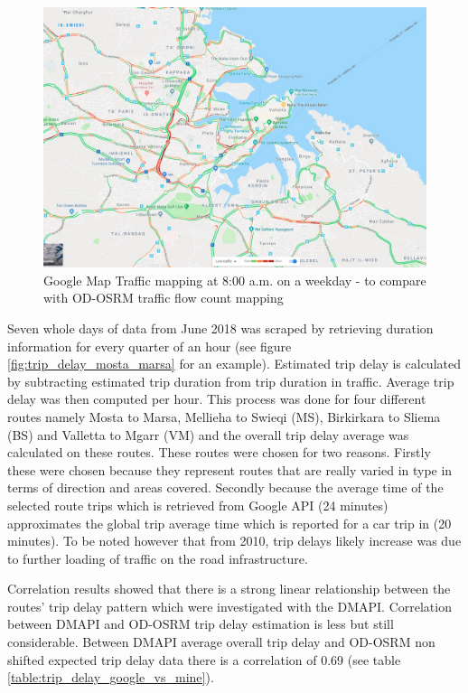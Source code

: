 \documentclass[12pt, a4paper]{report}
\theoremstyle{definition}
\theoremstyle{definition}%
\theoremstyle{definition}%
\theoremstyle{definition}%
\theoremstyle{definition}%
\theoremstyle{definition}%
\begin{document}
\begin{figure}[!]	
	\includegraphics[scale=0.4]{google_traffic_900am.jpg}
	\centering
	\caption[Google Map Traffic delay mapping]{Google Map Traffic mapping at 8:00 a.m. on a weekday - to compare with OD-OSRM traffic flow count mapping}
	\label{fig:trip_delay_google_900am}
\end{figure}
 

Seven whole days of data from June 2018 was scraped by retrieving duration information for every quarter of an hour (see figure \ref{fig:trip_delay_mosta_marsa} for an example). Estimated trip delay is calculated by subtracting estimated trip duration from trip duration in traffic. Average trip delay was then computed per hour. This process was done for four different routes namely Mosta to Marsa, Mellieha to Swieqi (MS), Birkirkara to Sliema (BS) and Valletta to Mgarr (VM) and the overall trip delay average was calculated on these routes. These routes were chosen for two reasons. Firstly these were chosen because they represent routes that are really varied in type in terms of direction and areas covered. Secondly because the average time of the selected route trips which is retrieved from Google API (24 minutes) approximates the global trip average time which is reported for a car trip in \cite{malta2011national} (20 minutes). To be noted however that from 2010, trip delays likely increase was due to further loading of traffic on the road infrastructure.

Correlation results showed that there is a strong linear relationship between the routes' trip delay pattern which were investigated with the DMAPI. Correlation between DMAPI and OD-OSRM trip delay estimation is less but still considerable. Between DMAPI average overall trip delay and OD-OSRM non shifted expected trip delay data there is a correlation of 0.69 (see table \ref{table:trip_delay_google_vs_mine}).
\end{document}

